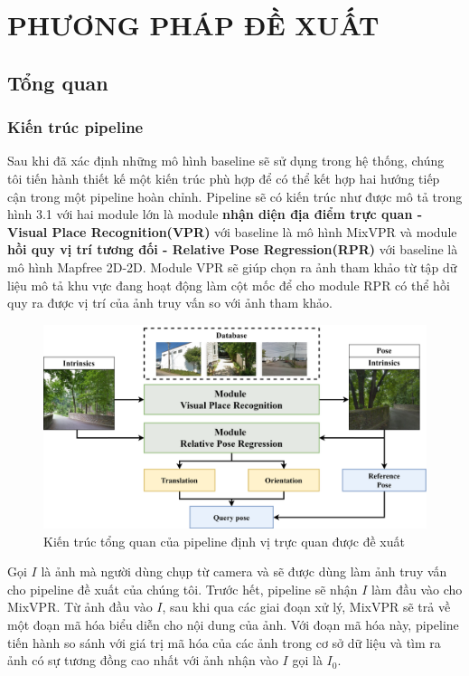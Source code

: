 \chapter{PHƯƠNG PHÁP ĐỀ XUẤT}

\section{Tổng quan}
\subsection{Kiến trúc pipeline}
Sau khi đã xác định những mô hình baseline sẽ sử dụng trong hệ thống, chúng tôi tiến hành thiết kế một kiến trúc phù hợp để có thể kết hợp hai hướng tiếp cận trong một pipeline hoàn chỉnh. Pipeline sẽ có kiến trúc như được mô tả trong hình 3.1 với hai module lớn là module \textbf{nhận diện địa điểm trực quan - Visual Place Recognition(VPR)} với baseline là mô hình MixVPR và module \textbf{hồi quy vị trí tương đối - Relative Pose Regression(RPR)} với baseline là mô hình Mapfree 2D-2D. Module VPR sẽ giúp chọn ra ảnh tham khảo từ tập dữ liệu mô tả khu vực đang hoạt động làm cột mốc để cho module RPR có thể hồi quy ra được vị trí của ảnh truy vấn so với ảnh tham khảo.

\begin{figure}[htbp]
  \centering
  \includegraphics[width=\textwidth]{pics/Proposal/arch.png}
  \caption{Kiến trúc tổng quan của pipeline định vị trực quan được đề xuất}
\end{figure}

Gọi $I$ là ảnh mà người dùng chụp từ camera và sẽ được dùng làm ảnh truy vấn cho pipeline đề xuất của chúng tôi. Trước hết, pipeline sẽ nhận $I$ làm đầu vào cho MixVPR. Từ ảnh đầu vào $I$, sau khi qua các giai đoạn xử lý, MixVPR sẽ trả về một đoạn mã hóa biểu diễn cho nội dung của ảnh. Với đoạn mã hóa này, pipeline tiến hành so sánh với giá trị mã hóa của các ảnh trong cơ sở dữ liệu và tìm ra ảnh có sự tương đồng cao nhất với ảnh nhận vào $I$ gọi là $I_0$.

